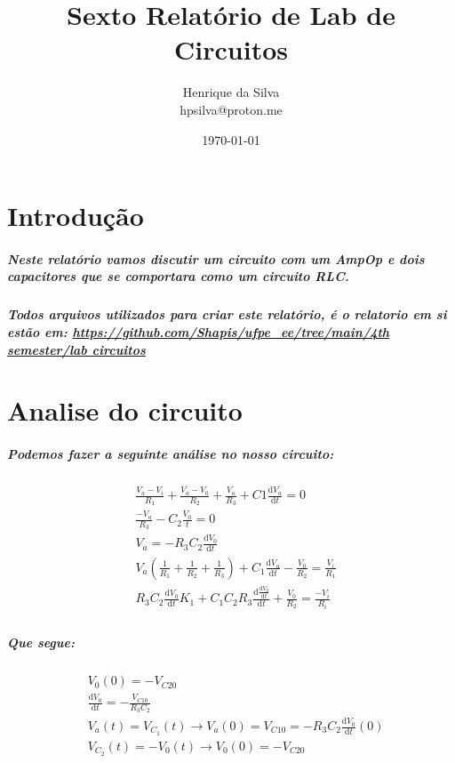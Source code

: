 \documentclass[12pt,twoside, a4paper, twocolumn]{article}
\title{Sexto Relatório de Lab de Circuitos}
\author{Henrique da Silva \\ hpsilva@proton.me}
\date{\today}
\newcommand\deriv[2]{\frac{\mathrm d #1}{\mathrm d #2}}
\begin{document}
\maketitle
{}
\newpage
\tableofcontents
\newpage



\section{Introdução}

\subparagraph*{Neste relatório vamos discutir um circuito com um AmpOp e dois capacitores que se comportara como um circuito RLC.}

\subparagraph*{Todos arquivos utilizados para criar este relatório, é o relatorio em si estão em:  \url{https://github.com/Shapis/ufpe_ee/tree/main/4th semester/lab circuitos}}


\section{Analise do circuito}

\subparagraph*{Podemos fazer a seguinte análise no nosso circuito:}

\begin{equation*}
    \begin{aligned}
         & \frac{V_a - V_i}{R_1} + \frac{V_a-V_0}{R_2} + \frac{V_a}{R_3}  + C1 \deriv{V_a}{t} = 0                                  \\
         & \frac{-V_a}{R_3} - C_2 \frac{V_0}{t} = 0                                                                                \\
         & V_a = -R_3 C_2 \deriv{V_0}{t}                                                                                           \\
         & V_a \left(\frac{1}{R_1} + \frac{1}{R_2} + \frac{1}{R_3}\right) + C_1 \deriv{V_a}{t} - \frac{V_0}{R_2} = \frac{V_i}{R_1} \\
         & R_3 C_2 \deriv{V_0}{t} K_1 + C_1 C_2 R_3 \deriv{\deriv{V_0}{t}}{t} + \frac{V_0}{R_2} = \frac{-V_i}{R_i}                 \\
    \end{aligned}
\end{equation*}

\subparagraph*{Que segue:}


\begin{equation*}
    \begin{aligned}
         & V_0(0) = - V_{C20}                                                             \\
         & \deriv{V_0}{t} = - \frac{V_{C10}}{R_3 C_2}                                     \\
         & V_a(t) = V_{C_1}(t) \rightarrow V_a(0) = V_{C10} = - R_3 C_2 \deriv{V_0}{t}(0) \\
         & V_{C_2}(t) = - V_0(t) \rightarrow V_0(0) = -V_{C20}                            \\
    \end{aligned}
\end{equation*}
\end{document}
